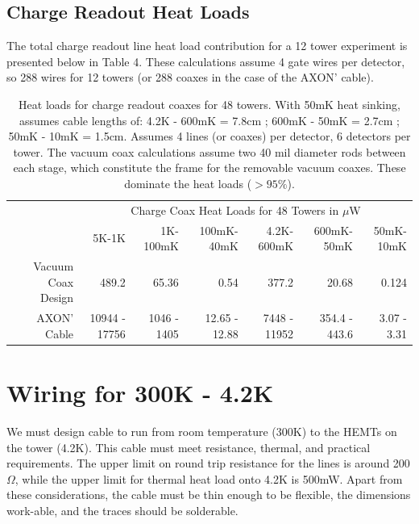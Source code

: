 \documentclass{article}
\begin{document}
\subsection{Charge Readout Heat Loads}

The total charge readout line heat load contribution for a 12 tower experiment is presented below in Table 4. These calculations assume 4 gate wires per detector, so 288 wires for 12 towers (or 288 coaxes in the case of the AXON' cable).

\begin{table}[h]
\begin{threeparttable}
\begin{tabular}{rrrr|rrr}
\toprule
 & \multicolumn{6}{c}{Charge Coax Heat Loads for 48 Towers in $\mu$W} \\
  & 5K-1K & 1K-100mK & 100mK-40mK & 4.2K-600mK & 600mK-50mK & 50mK-10mK \\
 \cmidrule(r){2-7}
   Vacuum Coax Design & 489.2 & 65.36 & 0.54 & 377.2 & 20.68 & 0.124 \\
   AXON' Cable & 10944 - 17756 & 1046 - 1405 & 12.65 - 12.88 & 7448 - 11952 & 354.4 - 443.6 & 3.07 - 3.31 \\
  \bottomrule
\end{tabular}
\end{threeparttable}
\caption{Heat loads for charge readout coaxes for 48 towers. With 50mK heat sinking, assumes cable lengths of: 4.2K - 600mK = 7.8cm ; 600mK - 50mK = 2.7cm ; 50mK - 10mK = 1.5cm. Assumes 4 lines (or coaxes) per detector, 6 detectors per tower. The vacuum coax calculations assume two 40 mil diameter rods between each stage, which constitute the frame for the removable vacuum coaxes. These dominate the heat loads ($>95\%$).}
\end{table}

\section{Wiring for 300K - 4.2K}

We must design cable to run from room temperature (300K) to the HEMTs on the tower (4.2K). This cable must meet resistance, thermal, and practical requirements. The upper limit on round trip resistance for the lines is around 200$\Omega$, while the upper limit for thermal heat load onto 4.2K is 500mW. Apart from these considerations, the cable must be thin enough to be flexible, the dimensions work-able, and the traces should be solderable\footnotemark.
\end{document}
